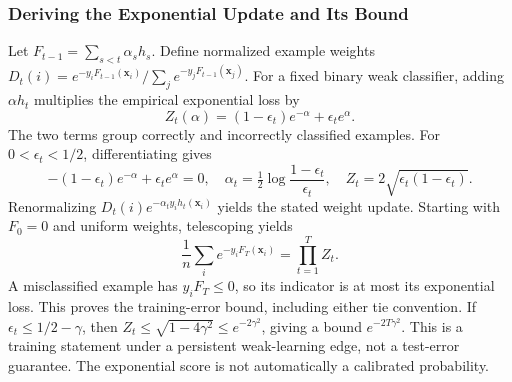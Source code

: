 \documentclass[11pt,twoside]{article}
\numberwithin{equation}{section}
\newcommand{\vect}[1]{\bm{#1}}
\theoremstyle{plain}
\theoremstyle{definition}
\theoremstyle{remark}
\begin{document}
\subsubsection{Deriving the Exponential Update and Its Bound}
Let $F_{t-1}=\sum_{s<t}\alpha_sh_s$. Define normalized example weights
$D_t(i)=e^{-y_iF_{t-1}(\vect x_i)}/\sum_j e^{-y_jF_{t-1}(\vect x_j)}$.
For a fixed binary weak classifier, adding $\alpha h_t$ multiplies the empirical exponential loss by
\[
Z_t(\alpha)=(1-\epsilon_t)e^{-\alpha}+\epsilon_t e^\alpha.
\]
The two terms group correctly and incorrectly classified examples. For $0<\epsilon_t<1/2$, differentiating gives
\[
-(1-\epsilon_t)e^{-\alpha}+\epsilon_t e^\alpha=0,
\quad \alpha_t=\tfrac12\log\frac{1-\epsilon_t}{\epsilon_t},
\quad Z_t=2\sqrt{\epsilon_t(1-\epsilon_t)}.
\]
Renormalizing $D_t(i)e^{-\alpha_t y_ih_t(\vect x_i)}$ yields the stated weight update. Starting with $F_0=0$ and uniform weights, telescoping yields
\[
\frac1n\sum_i e^{-y_iF_T(\vect x_i)}=\prod_{t=1}^T Z_t.
\]
A misclassified example has $y_iF_T\le0$, so its indicator is at most its exponential loss. This proves the training-error bound, including either tie convention. If $\epsilon_t\le1/2-\gamma$, then $Z_t\le\sqrt{1-4\gamma^2}\le e^{-2\gamma^2}$, giving a bound $e^{-2T\gamma^2}$. This is a training statement under a persistent weak-learning edge, not a test-error guarantee. The exponential score is not automatically a calibrated probability.
\end{document}
